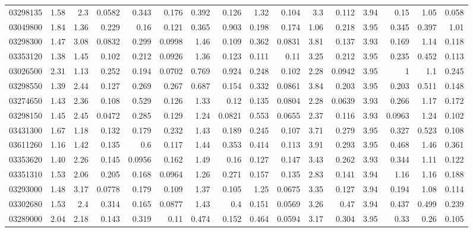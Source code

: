 \begin{longtable}{l r rr rr rr rr rr rr rr}
03298135 & 1.58 & 2.3 & {0.0582} & 0.343 & {0.176} & 0.392 & {0.126} & 1.32 & {0.104} & 3.3 & {0.112} & 3.94 & {0.15} & 1.05 & {0.058}\\
03049800 & 1.84 & 1.36 & {0.229} & 0.16 & {0.121} & 0.365 & 0.903 & 0.198 & {0.174} & 1.06 & {0.218} & 3.95 & {0.345} & 0.397 & 1.01\\
03298300 & 1.47 & 3.08 & {0.0832} & 0.299 & {0.0998} & 1.46 & {0.109} & 0.362 & {0.0831} & 3.81 & {0.137} & 3.93 & {0.169} & 1.14 & {0.118}\\
03353120 & 1.38 & 1.45 & {0.102} & 0.212 & {0.0926} & 1.36 & {0.123} & 0.111 & {0.11} & 3.25 & {0.212} & 3.95 & {0.235} & 0.452 & {0.113}\\
03026500 & 2.31 & 1.13 & {0.252} & 0.194 & {0.0702} & 0.769 & 0.924 & 0.248 & {0.102} & 2.28 & {0.0942} & 3.95 & {1} & 1.1 & {0.245}\\
03298550 & 1.39 & 2.44 & {0.127} & 0.269 & {0.267} & 0.687 & {0.154} & 0.332 & {0.0861} & 3.84 & {0.203} & 3.95 & {0.203} & 0.511 & {0.148}\\
03274650 & 1.43 & 2.36 & {0.108} & 0.529 & {0.126} & 1.33 & {0.12} & 0.135 & {0.0804} & 2.28 & {0.0639} & 3.93 & {0.266} & 1.17 & {0.172}\\
03298150 & 1.45 & 2.45 & {0.0472} & 0.285 & {0.129} & 1.24 & {0.0821} & 0.553 & {0.0655} & 2.37 & {0.116} & 3.93 & {0.0963} & 1.24 & {0.102}\\
03431300 & 1.67 & 1.18 & {0.132} & 0.179 & 0.232 & 1.43 & {0.189} & 0.245 & {0.107} & 3.71 & {0.279} & 3.95 & {0.327} & 0.523 & {0.108}\\
03611260 & 1.16 & 1.42 & {0.135} & 0.6 & {0.117} & 1.44 & {0.353} & 0.414 & {0.113} & 3.91 & {0.293} & 3.95 & {0.468} & 1.46 & {0.361}\\
03353620 & 1.40 & 2.26 & {0.145} & 0.0956 & 0.162 & 1.49 & {0.16} & 0.127 & 0.147 & 3.43 & {0.262} & 3.93 & {0.344} & 1.11 & {0.122}\\
03351310 & 1.53 & 2.06 & {0.205} & 0.168 & {0.0964} & 1.26 & {0.271} & 0.157 & {0.135} & 2.83 & {0.141} & 3.94 & {1.16} & 1.16 & {0.188}\\
03293000 & 1.48 & 3.17 & {0.0778} & 0.179 & {0.109} & 1.37 & {0.105} & 1.25 & {0.0675} & 3.35 & {0.127} & 3.94 & {0.194} & 1.08 & {0.114}\\
03302680 & 1.53 & 2.4 & {0.314} & 0.165 & {0.0877} & 1.43 & {0.4} & 0.151 & {0.0569} & 3.26 & {0.47} & 3.94 & {0.437} & 0.499 & {0.239}\\
03289000 & 2.04 & 2.18 & {0.143} & 0.319 & {0.11} & 0.474 & {0.152} & 0.464 & {0.0594} & 3.17 & {0.304} & 3.95 & {0.33} & 0.26 & {0.105}\\

\end{longtable}
